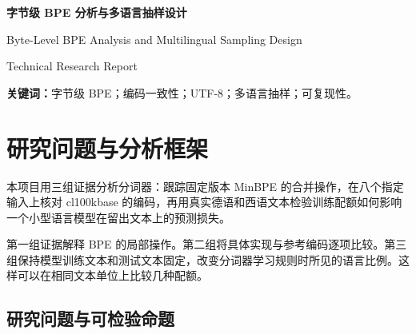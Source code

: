 \documentclass[11pt,a4paper]{article}
\newcommand{\BpeDocCodeInline}[1]{{\ttfamily #1}}
\newcommand{\BpeDocSection}[2]{\section{\texorpdfstring{#1}{#2}}}
\newcommand{\BpeDocSubsection}[2]{\subsection{\texorpdfstring{#1}{#2}}}
\begin{document}
\begin{center}
{\sffamily\fontsize{19}{26}\selectfont\bfseries 字节级 BPE 分析与多语言抽样设计\par}
\vspace{3mm}
{\large Byte-Level BPE Analysis and Multilingual Sampling Design\par}
\vspace{2mm}
{\small Technical Research Report\par}
\end{center}
\renewcommand{\abstractname}{摘要}
\begin{abstract}
本文通过源码与运行记录，跟踪 MinBPE 如何学习和应用合并规则。训练 abababab 时，第一轮得到四个连续的 ab 词元。第二轮统计到三个相邻位置对，从左往右合并时每个词元只能用一次，因此执行两次替换。另一个例子说明，编码新文本时按训练得到的规则优先级合并。在选定的八个普通文本输入上，MinBPE 包装器与 cl100k\_base 逐个编号一致，解码均还原原文。验证程序的十七组行为检查全部通过。另在真实德语和西语语料上比较三种配额、三个种子。将分词器训练份额从 90:10 改为 75:25 后，二元语言模型在留出集上的双语等权字节困惑度从 8.4111 降至 8.2738（下降 1.63\%），其中西语改善，德语略有退步。50:50 的均衡基线为 8.2709。
\end{abstract}
\noindent\textbf{关键词：}字节级 BPE；编码一致性；UTF-8；多语言抽样；可复现性。
\par\vspace{2mm}



\BpeDocSection{研究问题与分析框架}{研究问题与分析框架}


本项目用三组证据分析分词器：跟踪固定版本 MinBPE 的合并操作，在八个指定输入上核对 \BpeDocCodeInline{cl100k\relax\allowbreak{}base} 的编码，再用真实德语和西语文本检验训练配额如何影响一个小型语言模型在留出文本上的预测损失。


第一组证据解释 BPE 的局部操作。第二组将具体实现与参考编码逐项比较。第三组保持模型训练文本和测试文本固定，改变分词器学习规则时所见的语言比例。这样可以在相同文本单位上比较几种配额。


\BpeDocSubsection{研究问题与可检验命题}{研究问题与可检验命题}
\end{document}
